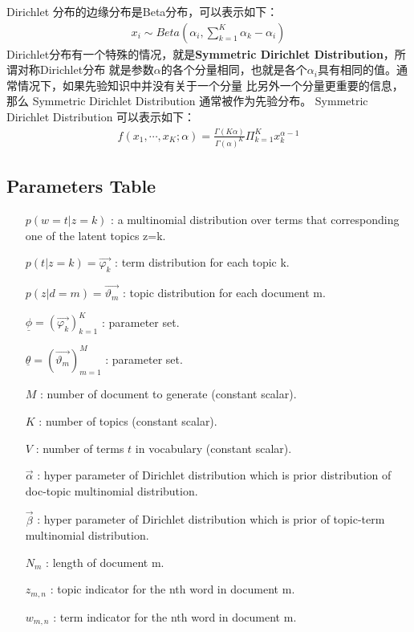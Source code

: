\documentclass[UTF8]{ctexart}
\begin{document}
Dirichlet 分布的边缘分布是Beta分布，可以表示如下：
\begin{align}
x_i \sim Beta(\alpha_i, \sum_{k=1}^K \alpha_k - \alpha_i)
\end{align}
Dirichlet分布有一个特殊的情况，就是\textbf{Symmetric Dirichlet Distribution}，所谓对称Dirichlet分布
就是参数$\alpha$的各个分量相同，也就是各个$\alpha_i$具有相同的值。通常情况下，如果先验知识中并没有关于一个分量
比另外一个分量更重要的信息，那么 Symmetric Dirichlet Distribution 通常被作为先验分布。
Symmetric Dirichlet Distribution
可以表示如下：
\begin{align}
f(x_1, \cdots, x_K; \alpha) = \frac{\Gamma(K\alpha)}{\Gamma(\alpha)^K} \Pi_{k=1}^K x_k^{\alpha-1}
\end{align}

\subsection{Parameters Table}
\begin{itemize}
\item[$p(w=t|z=k)$]: a multinomial distribution over terms that corresponding 
one of the latent topics z=k.
\item[$p(t|z=k)=\vec{\varphi_k}$]: term distribution for each topic k.
\item[$p(z|d=m)=\vec{\vartheta_m}$]: topic distribution for each document m.
\item[$\underline{\phi}=\left( \vec{\varphi_k} \right) _{k=1}^K$]: parameter set.
\item[$\underline{\theta}=\left( \vec{\vartheta_m}\right)_{m=1}^M$]: parameter set.
\item[$M$]: number of document to generate (constant scalar).
\item[$K$]: number of topics (constant scalar).
\item[$V$]: number of terms $t$ in vocabulary (constant scalar).
\item[$\vec{\alpha}$]: hyper parameter of Dirichlet distribution which is prior distribution of
 doc-topic multinomial distribution.
\item[$\vec{\beta}$]: hyper parameter of Dirichlet distribution which is prior of topic-term 
multinomial distribution.
\item[$N_m$]: length of document m.
\item[$z_{m,n}$]: topic indicator for the nth word in document m.
\item[$w_{m,n}$]: term indicator for the nth word in document m.
\end{itemize}
\end{document}
